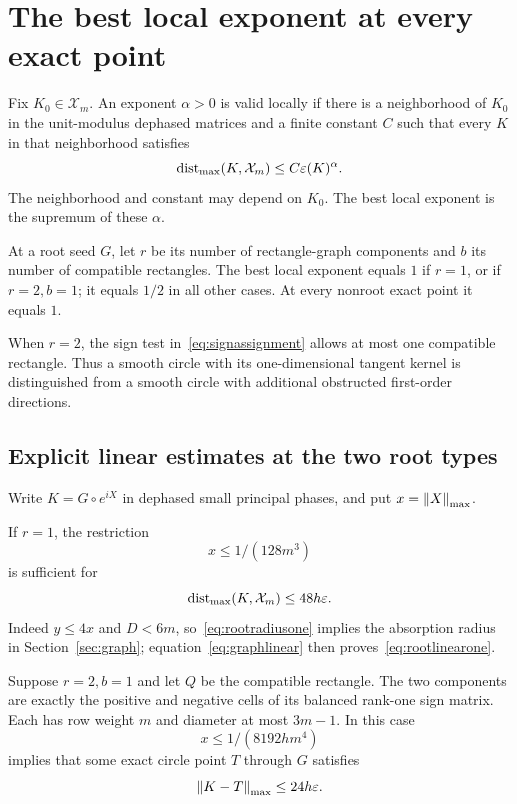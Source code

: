 \section{The best local exponent at every exact point}\label{sec:local}
\begin{definition}\label{def:exponent}
Fix $K_0\in\mathcal X_m$. An exponent $\alpha>0$ is valid locally if there is a neighborhood of $K_0$ in the unit-modulus dephased matrices and a finite constant $C$ such that every $K$ in that neighborhood satisfies
\[
 \operatorname{dist}_{\mathrm{max}}(K,\mathcal X_m)\le C\varepsilon(K)^\alpha.
\]
The neighborhood and constant may depend on $K_0$. The best local exponent is the supremum of these $\alpha$.
\end{definition}

\begin{theorem}\label{thm:local}
At a root seed $G$, let $r$ be its number of rectangle-graph components and $b$ its number of compatible rectangles. The best local exponent equals $1$ if $r=1$, or if $r=2,b=1$; it equals $1/2$ in all other cases. At every nonroot exact point it equals $1$.
\end{theorem}
When $r=2$, the sign test in~\eqref{eq:signassignment} allows at most one compatible rectangle. Thus a smooth circle with its one-dimensional tangent kernel is distinguished from a smooth circle with additional obstructed first-order directions.

\subsection{Explicit linear estimates at the two root types}
Write $K=G\circ e^{iX}$ in dephased small principal phases, and put $x=\left\lVert X\right\rVert_{\mathrm{max}}$.

If $r=1$, the restriction
\begin{equation}\label{eq:rootradiusone}
 x\le1/(128m^3)
\end{equation}
is sufficient for
\begin{equation}\label{eq:rootlinearone}
 \operatorname{dist}_{\mathrm{max}}(K,\mathcal X_m)\le48h\varepsilon.
\end{equation}
Indeed $y\le4x$ and $D<6m$, so~\eqref{eq:rootradiusone} implies the absorption radius in Section~\ref{sec:graph}; equation~\eqref{eq:graphlinear} then proves~\eqref{eq:rootlinearone}.

Suppose $r=2,b=1$ and let $Q$ be the compatible rectangle. The two components are exactly the positive and negative cells of its balanced rank-one sign matrix. Each has row weight $m$ and diameter at most $3m-1$. In this case
\begin{equation}\label{eq:rootradiustwo}
 x\le1/(8192hm^4)
\end{equation}
implies that some exact circle point $T$ through $G$ satisfies
\begin{equation}\label{eq:rootlineartwo}
 \left\lVert K-T\right\rVert_{\mathrm{max}}\le24h\varepsilon.
\end{equation}


